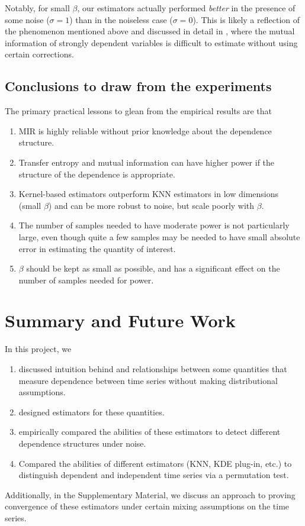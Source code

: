 \documentclass{article} %
\begin{document}
Notably, for small $\beta$, our estimators actually performed \emph{better} in
the presence of some noise ($\sigma = 1$) than in the noiseless case
($\sigma = 0$). This is likely a reflection of the phenomenon mentioned above
and discussed in detail in \cite{gao2014stronglyDependent}, where the mutual
information of strongly dependent variables is difficult to estimate without
using certain corrections.

\subsection{Conclusions to draw from the experiments}
The primary practical lessons to glean from the empirical results are that
\begin{enumerate}
\item MIR is highly reliable without prior knowledge about the dependence
structure.
\item Transfer entropy and mutual information can have higher power
if the structure of the dependence is appropriate.
\item Kernel-based estimators outperform KNN estimators in low dimensions
(small $\beta$) and can be more robust to noise, but scale poorly with $\beta$.
\item The number of samples needed to have moderate power is not particularly
large, even though quite a few samples may be needed to have small absolute
error in estimating the quantity of interest.
\item $\beta$ should be kept as small as possible, and has a significant effect
on the number of samples needed for power.
\end{enumerate}

\section{Summary and Future Work}
In this project, we
\begin{enumerate}
\item discussed intuition behind and relationships between some quantities that
measure dependence between time series without making distributional
assumptions.
\item designed estimators for these quantities.
\item empirically compared the abilities of these estimators to detect
different dependence structures under noise.
\item Compared the abilities of different estimators (KNN, KDE plug-in, etc.)
to distinguish dependent and independent time series via a permutation test.
\end{enumerate}
Additionally, in the Supplementary Material, we discuss an approach to proving
convergence of these estimators under certain mixing assumptions on the time
series.
\end{document}
